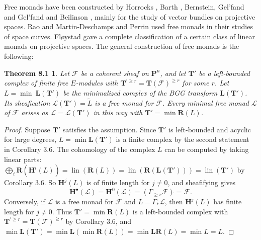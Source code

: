 \documentclass{tran-l}
\newcommand{\lin}{\operatorname{lin}}
\newcommand{\F}{\mathcal{F}}
\newcommand{\myH}{\mathbf{H}}
\newcommand{\LL}{\mathbf{L}}
\newcommand{\myP}{\mathbf{P}}
\newcommand{\RR}{\mathbf{R}}
\newcommand{\TT}{\mathbf{T}}
\theoremstyle{plain}
\newtheorem*{theorem29}{Theorem 8.1}
\theoremstyle{remark}
\theoremstyle{definition}
\begin{document}
Free monads  have been constructed by Horrocks \cite{Hor},
Barth \cite{Bar}, Bernstein, Gel'fand and Gel'fand \cite{BGG}
and Beilinson \cite{Bei},
mainly for the study of vector bundles on projective spaces.
Rao \cite{Rao} and
Martin-Deschamps and Perrin \cite{MP} used free monads in their studies
of space curves. 
Fl\o ystad \cite{Flo3} gave a complete classification of a certain class of 
linear monads on projective spaces.
The general construction of free monads is the following:
\begin{theorem29}
Let $\F $ be a coherent sheaf on $\myP ^{n}$, and let $\TT '$ be a left-bounded
complex of finite free $E$-modules with $\TT ^{\prime \ge r}=\TT (\F )^{\ge r}$ for some $r$.
Let  $L =\min \ \LL (\TT ')$ be the minimalized complex of the BGG transform
$\LL (\TT ')$. Its sheafication
$\mathcal{L}(\TT ') =\tilde L $
is a free monad for $\F $. Every minimal free monad $\mathcal{L}$ of $\F $
arises as $\mathcal{L}=\mathcal{L}(\TT ')$ in this way
with $\TT '= \min \RR (L)$.
\end{theorem29}
\begin{proof}  Suppose $\TT '$ satisfies the assumption. Since $\TT '$ is 
left-bounded and
acyclic for large degrees, $L =\min \LL (\TT ')$ is a finite complex by the second statement in Corollary 3.6.
The cohomology of the complex $L$ can be
computed  by taking linear parts:
$\bigoplus _{i} \RR (\myH ^{i}(L ))= \lin (\RR (L ))=
\lin (\RR (\LL (\TT ')))=\lin (\TT ')$ by Corollary 3.6.
So $\myH ^{j}(L )$  is of finite length for $j\not =0$, and sheafifying gives
\begin{equation*}\myH ^{\bullet }(\mathcal{L})=\myH ^{0}(\mathcal{L})=  (\Gamma _{\ge r}\F )\widetilde {} = \F .\end{equation*}
Conversely, if $\mathcal{L}$ is a free monad for $\F $
and $L=\Gamma _{*}\mathcal{L}$, then  $\myH ^{j}(L )$
has finite length for $j\not = 0$. Thus
$\TT '=\min \RR (L )$ is a left-bounded complex with
$\TT ^{'\ge r} = \TT (\F )^{\ge r}$ by  Corollary 3.6, and
$ \min \LL (\TT ')=\min {\LL }(\min \RR (L ))=
\min {\LL }\RR (L )=\min L =L $.
\end{proof}
\end{document}
